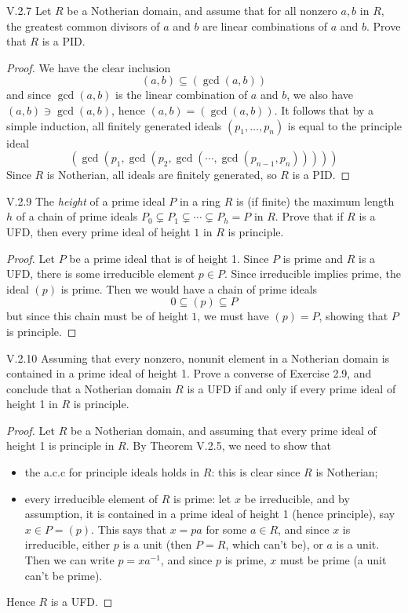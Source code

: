 \begin{problem}{V.2.7}
Let $R$ be a Notherian domain, and assume that for all nonzero $a,b$ in $R$, the greatest common divisors of $a$ and $b$ are linear combinations of $a$ and $b$. Prove that $R$ is a PID.
\end{problem}
\begin{proof}
We have the clear inclusion
\[
(a,b) \subseteq (\gcd(a,b))	
\]
and since $\gcd(a,b)$ is the linear combination of $a$ and $b$, we also have $(a,b) \ni \gcd(a,b)$, hence $(a,b) = (\gcd(a,b))$. It follows that by a simple induction, all finitely generated ideals $(p_1,\dotsc,p_n)$ is equal to the principle ideal
\[
(\gcd(p_1, \gcd(p_2, \gcd(\cdots,\gcd(p_{n-1}, p_n)))))
\]
Since $R$ is Notherian, all ideals are finitely generated, so $R$ is a PID.
\end{proof}

\begin{problem}{V.2.9}
The \emph{height} of a prime ideal $P$ in a ring $R$ is (if finite) the maximum length $h$ of a chain of prime ideals $P_0 \subsetneq P_1 \subsetneq \cdots \subsetneq P_h = P$ in $R$. Prove that if $R$ is a UFD, then every prime ideal of height $1$ in $R$ is principle.
\end{problem}
\begin{proof}
Let $P$ be a prime ideal that is of height 1. Since $P$ is prime and $R$ is a UFD, there is some irreducible element $p \in P$. Since irreducible implies prime, the ideal $(p)$ is prime. Then we would have a chain of prime ideals 
\[
0 \subseteq (p) \subseteq P
\]
but since this chain must be of height $1$, we must have $(p) = P$, showing that $P$ is principle.
\end{proof}

\begin{problem}{V.2.10}
Assuming that every nonzero, nonunit element in a Notherian domain is contained in a prime ideal of height 1. Prove a converse of Exercise 2.9, and conclude that a Notherian domain $R$ is a UFD if and only if every prime ideal of height 1 in $R$ is principle.
\end{problem}
\begin{proof}
Let $R$ be a Notherian domain, and assuming that every prime ideal of height 1 is principle in $R$. By Theorem V.2.5, we need to show that
\begin{itemize}
	\setlength\itemsep{0pt}
	\item the a.c.c for principle ideals holds in $R$: this is clear since $R$ is Notherian;
	\item every irreducible element of $R$ is prime: let $x$ be irreducible, and by assumption, it is contained in a prime ideal of height 1 (hence principle), say $x \in P = (p)$. This says that $x = pa$ for some $a \in R$, and since $x$ is irreducible, either $p$ is a unit (then $P=R$, which can't be), or $a$ is a unit. Then we can write $p = xa^{-1}$, and since $p$ is prime, $x$ must be prime (a unit can't be prime).
\end{itemize}
Hence $R$ is a UFD.
\end{proof}


